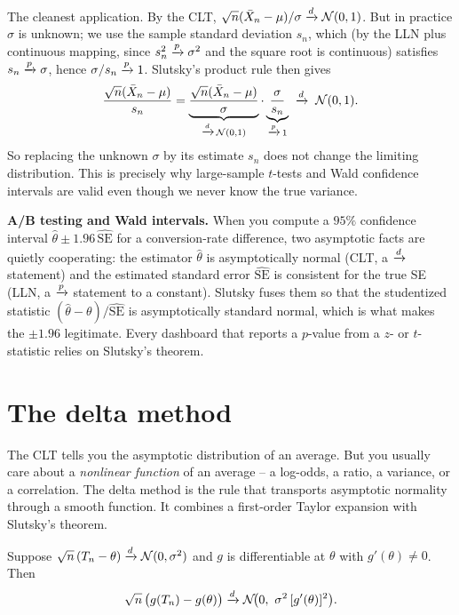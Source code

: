 \begin{example}
\label{ch22:ex-tstat}
The cleanest application. By the CLT,
$\sqrt n(\bar X_n - \mu)/\sigma \xrightarrow{d} \mathcal{N}(0,1)$. But in practice $\sigma$ is
unknown; we use the sample standard deviation $s_n$, which (by the LLN plus continuous
mapping, since $s_n^2\xrightarrow{p}\sigma^2$ and the square root is continuous) satisfies
$s_n\xrightarrow{p}\sigma$, hence $\sigma/s_n\xrightarrow{p}1$. Slutsky's product rule then gives
\[
  \frac{\sqrt n(\bar X_n - \mu)}{s_n}
  = \underbrace{\frac{\sqrt n(\bar X_n - \mu)}{\sigma}}_{\xrightarrow{d}\,\mathcal{N}(0,1)}
    \cdot
    \underbrace{\frac{\sigma}{s_n}}_{\xrightarrow{p}\,1}
  \;\xrightarrow{d}\; \mathcal{N}(0,1).
\]
So replacing the unknown $\sigma$ by its estimate $s_n$ does not change the limiting
distribution. This is precisely why large-sample $t$-tests and Wald confidence
intervals are valid even though we never know the true variance.
\end{example}

\begin{applicationbox}
\textbf{A/B testing and Wald intervals.} When you compute a $95\%$ confidence interval
$\hat\theta \pm 1.96\,\widehat{\mathrm{SE}}$ for a conversion-rate difference, two
asymptotic facts are quietly cooperating: the estimator $\hat\theta$ is asymptotically
normal (CLT, a $\xrightarrow{d}$ statement) and the estimated standard error
$\widehat{\mathrm{SE}}$ is consistent for the true SE (LLN, a $\xrightarrow{p}$ statement to a
constant). Slutsky fuses them so that the studentized statistic
$(\hat\theta-\theta)/\widehat{\mathrm{SE}}$ is asymptotically standard normal, which
is what makes the $\pm1.96$ legitimate. Every dashboard that reports a $p$-value from
a $z$- or $t$-statistic relies on Slutsky's theorem.
\end{applicationbox}

\section{The delta method}
\label{ch22:delta}

The CLT tells you the asymptotic distribution of an average. But you usually care
about a \emph{nonlinear function} of an average -- a log-odds, a ratio, a variance, or a
correlation. The delta method is the rule that transports asymptotic normality through
a smooth function. It combines a first-order Taylor expansion with Slutsky's theorem.

\begin{theorem}
\label{ch22:thm-delta}
Suppose $\sqrt n\,(T_n - \theta) \xrightarrow{d} \mathcal{N}(0,\sigma^2)$ and $g$ is differentiable
at $\theta$ with $g'(\theta)\ne0$. Then
\[
  \sqrt n\,\big(g(T_n) - g(\theta)\big) \xrightarrow{d} \mathcal{N}\!\big(0,\ \sigma^2\,[g'(\theta)]^2\big).
\]
\end{theorem}

